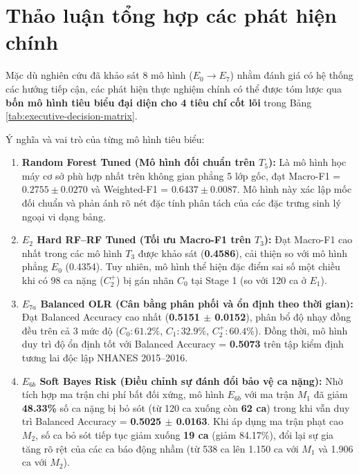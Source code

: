 \section{Thảo luận tổng hợp các phát hiện chính}
\label{sec:thao-luan-tong-hop}

Mặc dù nghiên cứu đã khảo sát 8 mô hình ($E_0 \to E_7$) nhằm đánh giá có hệ thống các hướng tiếp cận, các phát hiện thực nghiệm chính có thể được tóm lược qua \textbf{bốn mô hình tiêu biểu đại diện cho 4 tiêu chí cốt lõi} trong Bảng \ref{tab:executive-decision-matrix}.



Ý nghĩa và vai trò của từng mô hình tiêu biểu:
\begin{enumerate}
    \item \textbf{Random Forest Tuned (Mô hình đối chuẩn trên $T_5$):} Là mô hình học máy cơ sở phù hợp nhất trên không gian phẳng 5 lớp gốc, đạt Macro-F1 = $0.2755 \pm 0.0270$ và Weighted-F1 = $0.6437 \pm 0.0087$. Mô hình này xác lập mốc đối chuẩn và phản ánh rõ nét đặc tính phân tách của các đặc trưng sinh lý ngoại vi dạng bảng.
    \item \textbf{$E_2$ Hard RF--RF Tuned (Tối ưu Macro-F1 trên $T_3$):} Đạt Macro-F1 cao nhất trong các mô hình $T_3$ được khảo sát (\textbf{0.4586}), cải thiện so với mô hình phẳng $E_0$ (0.4354). Tuy nhiên, mô hình thể hiện đặc điểm sai số một chiều khi có 98 ca nặng ($C_2^+$) bị gán nhãn $C_0$ tại Stage 1 (so với 120 ca ở $E_1$).
    \item \textbf{$E_{7a}$ Balanced OLR (Cân bằng phân phối và ổn định theo thời gian):} Đạt Balanced Accuracy cao nhất (\textbf{0.5151 $\pm$ 0.0152}), phân bổ độ nhạy đồng đều trên cả 3 mức độ ($C_0: 61.2\%$, $C_1: 32.9\%$, $C_2^+: 60.4\%$). Đồng thời, mô hình duy trì độ ổn định tốt với Balanced Accuracy = \textbf{0.5073} trên tập kiểm định tương lai độc lập NHANES 2015--2016.
    \item \textbf{$E_{6b}$ Soft Bayes Risk (Điều chỉnh sự đánh đổi bảo vệ ca nặng):} Nhờ tích hợp ma trận chi phí bất đối xứng, mô hình $E_{6b}$ với ma trận $M_1$ đã giảm \textbf{48.33\%} số ca nặng bị bỏ sót (từ 120 ca xuống còn \textbf{62 ca}) trong khi vẫn duy trì Balanced Accuracy = \textbf{0.5025 $\pm$ 0.0163}. Khi áp dụng ma trận phạt cao $M_2$, số ca bỏ sót tiếp tục giảm xuống \textbf{19 ca} (giảm 84.17\%), đổi lại sự gia tăng rõ rệt của các ca báo động nhầm (từ 538 ca lên 1.150 ca với $M_1$ và 1.906 ca với $M_2$).
\end{enumerate}

